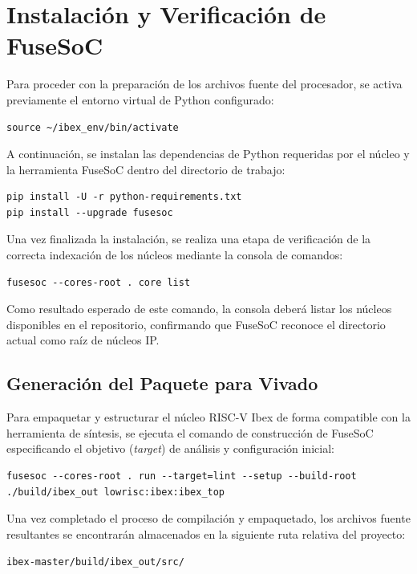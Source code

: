 \section{Instalación y Verificación de FuseSoC}
Para proceder con la preparación de los archivos fuente del procesador, se activa previamente el entorno virtual de Python configurado:

\begin{lstlisting}[style=bashstyle]
source ~/ibex_env/bin/activate
\end{lstlisting}

A continuación, se instalan las dependencias de Python requeridas por el núcleo y la herramienta FuseSoC dentro del directorio de trabajo:

\begin{lstlisting}[style=bashstyle]
pip install -U -r python-requirements.txt
pip install --upgrade fusesoc
\end{lstlisting}

Una vez finalizada la instalación, se realiza una etapa de verificación de la correcta indexación de los núcleos mediante la consola de comandos:

\begin{lstlisting}[style=bashstyle]
fusesoc --cores-root . core list
\end{lstlisting}

Como resultado esperado de este comando, la consola deberá listar los núcleos disponibles en el repositorio, confirmando que FuseSoC reconoce el directorio actual como raíz de núcleos IP.

\subsection{Generación del Paquete para Vivado}
Para empaquetar y estructurar el núcleo RISC-V Ibex de forma compatible con la herramienta de síntesis, se ejecuta el comando de construcción de FuseSoC especificando el objetivo (\textit{target}) de análisis y configuración inicial:

\begin{lstlisting}[style=bashstyle]
fusesoc --cores-root . run --target=lint --setup --build-root ./build/ibex_out lowrisc:ibex:ibex_top
\end{lstlisting}

Una vez completado el proceso de compilación y empaquetado, los archivos fuente resultantes se encontrarán almacenados en la siguiente ruta relativa del proyecto:
\begin{center}
\texttt{ibex-master/build/ibex\_out/src/}
\end{center}

